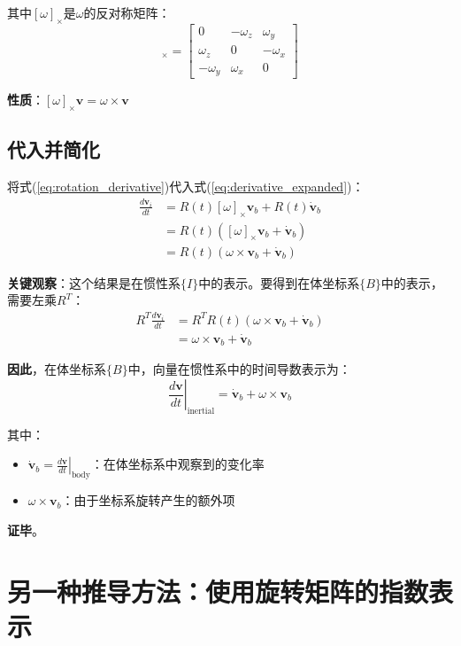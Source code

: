 \documentclass[12pt,a4paper]{article}
\begin{document}
其中$[\omega]_{\times}$是$\omega$的反对称矩阵：
\begin{equation}
[\omega]_{\times} = \begin{bmatrix}
0 & -\omega_z & \omega_y \\
\omega_z & 0 & -\omega_x \\
-\omega_y & \omega_x & 0
\end{bmatrix}
\end{equation}

\textbf{性质}：$[\omega]_{\times} \bm{v} = \omega \times \bm{v}$

\subsection{代入并简化}

将式(\ref{eq:rotation_derivative})代入式(\ref{eq:derivative_expanded})：
\begin{align}
\frac{d\bm{v}_i}{dt} &= R(t) [\omega]_{\times} \bm{v}_b + R(t) \dot{\bm{v}}_b \\
&= R(t) ([\omega]_{\times} \bm{v}_b + \dot{\bm{v}}_b) \\
&= R(t) (\omega \times \bm{v}_b + \dot{\bm{v}}_b)
\end{align}

\textbf{关键观察}：这个结果是在惯性系$\{I\}$中的表示。要得到在体坐标系$\{B\}$中的表示，需要左乘$R^T$：
\begin{align}
R^T \frac{d\bm{v}_i}{dt} &= R^T R(t) (\omega \times \bm{v}_b + \dot{\bm{v}}_b) \\
&= \omega \times \bm{v}_b + \dot{\bm{v}}_b
\end{align}

\textbf{因此}，在体坐标系$\{B\}$中，向量在惯性系中的时间导数表示为：
\begin{equation}
\left.\frac{d\bm{v}}{dt}\right|_{\text{inertial}} = \dot{\bm{v}}_b + \omega \times \bm{v}_b
\end{equation}

其中：
\begin{itemize}
\item $\dot{\bm{v}}_b = \left.\frac{d\bm{v}}{dt}\right|_{\text{body}}$：在体坐标系中观察到的变化率
\item $\omega \times \bm{v}_b$：由于坐标系旋转产生的额外项
\end{itemize}

\textbf{证毕}。

\section{另一种推导方法：使用旋转矩阵的指数表示}
\end{document}
